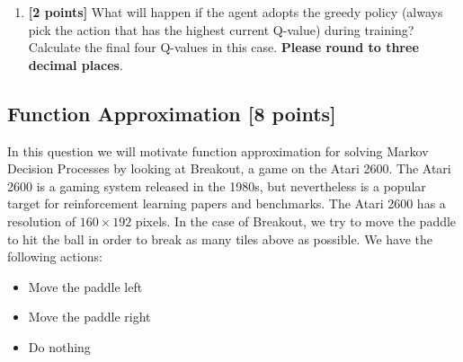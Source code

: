 \documentclass[11pt]{article}
\numberwithin{equation}{section} %
\numberwithin{figure}{section} %
\numberwithin{table}{section} %
\newcommand{\points}[1]{{\bf [#1 points]}}
\begin{document}
\begin{enumerate}
\begin{tcolorbox}[fit,height=3cm, width=\linewidth, blank, borderline={1pt}{-2pt},nobeforeafter]
\end{tcolorbox}


\clearpage
\item \textbf{[2 points]} What will happen if the agent adopts the greedy policy (always pick the action that has the highest current Q-value) during training? Calculate the final four Q-values in this case. \textbf{Please round to three decimal places}.

\begin{tcolorbox}[fit,height=3cm, width=\linewidth, blank, borderline={1pt}{-2pt},nobeforeafter]
\end{tcolorbox}


\end{enumerate}

\clearpage

\subsection{Function Approximation \points{8}}
\label{sec:FA}
In this question we will motivate function approximation for solving Markov Decision Processes by looking at Breakout, a game on the Atari 2600. The Atari 2600 is a gaming system released in the 1980s, but nevertheless is a popular target for reinforcement learning papers and benchmarks. The Atari 2600 has a resolution of $160 \times 192$ pixels. In the case of Breakout, we try to move the paddle to hit the ball in order to break as many tiles above as possible. We have the following actions:
\begin{itemize}
    \item Move the paddle left
    \item Move the paddle right
    \item Do nothing
\end{itemize}
\end{document}
